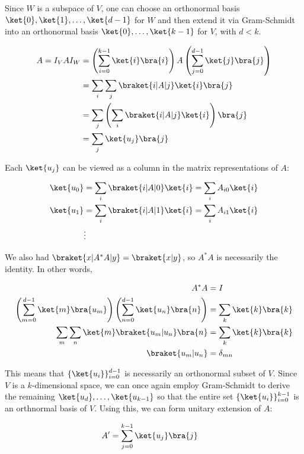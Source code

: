 \par Since $W$ is a subspace of $V$, one can choose an orthonormal basis
$\ket{0}, \ket{1}, \ldots, \ket{d-1}$ for $W$ and then extend it via
Gram-Schmidt into an orthonormal basis $\ket{0}, \ldots, \ket{k-1}$ for $V$,
with $d < k$.

\begin{align}
A = I_V A I_W &= \left( \sum_{i = 0}^{k - 1}{\ket{i} \bra{i}} \right) A \left(
\sum_{j = 0}^{d - 1}{\ket{j} \bra{j}} \right) \\
&= \sum_i{\sum_j{\braket{i|A|j} \ket{i} \bra{j}}} \\
&= \sum_j{\left( \sum_i{\braket{i|A|j} \ket{i}} \right) \bra{j}} \\
&= \sum_j{\ket{u_j} \bra{j}}
\end{align}

\par Each $\ket{u_j}$ can be viewed as a column in the matrix representations of
$A$:

\begin{align*}
\ket{u_0} &= \sum_i{\braket{i|A|0} \ket{i}} = \sum_i{A_{i0} \ket{i}} \\
\ket{u_1} &= \sum_i{\braket{i|A|1} \ket{i}} = \sum_i{A_{i1} \ket{i}} \\
&\vdots
\end{align*}

\par We also had $\braket{x|A^* A|y} = \braket{x|y}$, so $A^* A$ is necessarily
the identity. In other words,

\begin{align}
A^* A &= I \\
\left( \sum_{m = 0}^{d - 1}{\ket{m} \bra{u_m}} \right) \left( \sum_{n = 0}^{d -
1}{\ket{u_n} \bra{n}} \right) &= \sum_k{\ket{k} \bra{k}} \\
\sum_m{\sum_n{\ket{m} \braket{u_m|u_n} \bra{n}}} &= \sum_k{\ket{k} \bra{k}} \\
\braket{u_m|u_n} &= \delta_{mn}
\end{align}

This means that $\{\ket{u_i}\}_{i = 0}^{d - 1}$ is necessarily an orthonormal
subset of $V$. Since $V$ is a $k$-dimensional space, we can once again employ
Gram-Schmidt to derive the remaining $\ket{u_d}, \ldots, \ket{u_{k-1}}$ so that
the entire set $\{\ket{u_i}\}_{i = 0}^{k - 1}$ is an orthnormal basis of $V$.
Using this, we can form unitary extension of $A$:

\begin{align}
A' &= \sum_{j = 0}^{k - 1}{\ket{u_j} \bra{j}}
\end{align}
